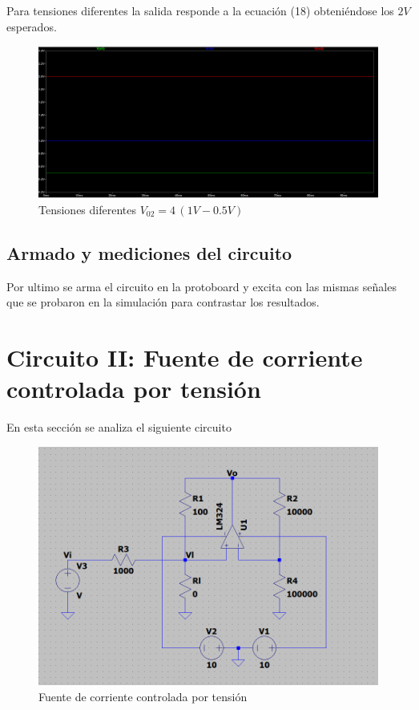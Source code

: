 \documentclass[12pt]{article}
\begin{document}
		Para tensiones diferentes la salida responde a la ecuación (18) obteniéndose los $2V$ esperados.
		\begin{figure}[h]
			\centering
			\includegraphics[width=1\linewidth]{Simulaciones-Resultados/Circuito1_Vo2-Vi1-Vi2}
			\caption{Tensiones diferentes $V_{02}=4\,(1V-0.5V)$}
			\label{fig:circuito1vo2-vi1-vi2}
		\end{figure}
		
			\subsection{Armado y mediciones del circuito}
			Por ultimo se arma el circuito en la protoboard y excita  con las mismas señales que
			se probaron en la simulación para contrastar los resultados. \newpage
			
	\section {Circuito II: Fuente de corriente controlada por tensión}
		En esta sección se analiza el siguiente circuito
		\begin{figure}[h]
			\centering
			\includegraphics[width=1\linewidth]{Simulaciones-Resultados/Circuito2_esquematico}
			\caption{Fuente de corriente controlada por tensión}
			\label{fig:circuito2esquematico}
		\end{figure}
		
\end{document}
